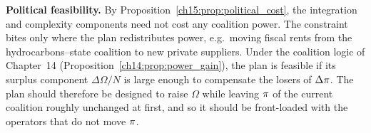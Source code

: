 \documentclass[../solutions_manual.tex]{subfiles}
\begin{document}
 \textbf{Political feasibility.} By Proposition~\ref{ch15:prop:political_cost}, the integration and complexity components need not cost any coalition power. The constraint bites only where the plan redistributes power, e.g.\ moving fiscal rents from the hydrocarbons--state coalition to new private suppliers. Under the coalition logic of Chapter~14 (Proposition~\ref{ch14:prop:power_gain}), the plan is feasible if its surplus component $\Delta\Omega/N$ is large enough to compensate the losers of $\Delta\pi$. The plan should therefore be designed to raise $\Omega$ while leaving $\pi$ of the current coalition roughly unchanged at first, and so it should be front-loaded with the operators that do not move $\pi$.

\endgroup
\end{document}
